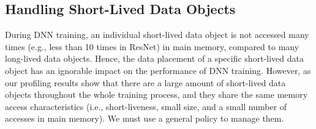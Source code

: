 







\subsection{Handling Short-Lived Data Objects}
\label{sec:short-lived}
During DNN training, an individual short-lived data object is not accessed many times (e.g., less than 10 times in ResNet) in main memory, compared to many long-lived data objects. Hence, the data placement of a specific short-lived data object has an ignorable impact on the performance of DNN training. However, as our profiling results show that there are a large amount of short-lived data objects throughout the whole training process, and they share the same memory access characteristics (i.e., short-liveness, small size, and a small number of accesses in main memory). We must use a general policy to manage them.   

